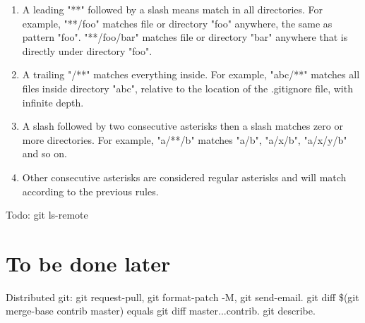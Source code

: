 \documentclass{charun}
\begin{document}
\begin{enumerate}
\item A leading "**" followed by a slash means match in all directories. For example, "**/foo" matches file or directory "foo" anywhere, the same as pattern "foo". "**/foo/bar" matches file or directory "bar" anywhere that is directly under directory "foo".
\item A trailing "/**" matches everything inside. For example, "abc/**" matches all files inside directory "abc", relative to the location of the .gitignore file, with infinite depth.
\item A slash followed by two consecutive asterisks then a slash matches zero or more directories. For example, "a/**/b" matches "a/b", "a/x/b", "a/x/y/b" and so on.
\item Other consecutive asterisks are considered regular asterisks and will match according to the previous rules.
\end{enumerate}

Todo: git ls-remote

\section{To be done later}
Distributed git: git request-pull, git format-patch -M, git send-email.
git diff \$(git merge-base contrib master) equals git diff master...contrib.
git describe.
\end{document}
